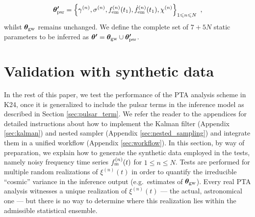\documentclass[fleqn,usenatbib,useAMS]{mnras}
\begin{document}
\begin{equation}
	\boldsymbol{\theta'}_{\rm psr} = \left \{ \gamma^{(n)},\sigma^{(n)}, f_{\rm em}^{(n)}(t_1),\dot{f}_{\rm em}^{(n)}(t_1),\chi^{(n)} \right\}_{1\leq n \leq N} \ ,  \label{eq:psrparamsnew}
\end{equation}
whilst $\boldsymbol{\theta}_{\rm gw}$  remains unchanged. We define the complete set of $7 +5N$ static parameters to be inferred as $\boldsymbol{\theta'} = \boldsymbol{\theta}_{\rm gw} \cup \boldsymbol{\theta'}_{\rm psr}$.  
%


\section{Validation with synthetic data}\label{sec:rep_example1}
In the rest of this paper, we test the performance of the PTA analysis scheme in K24, once it is generalized to include the pulsar terms in the inference model as described in Section \ref{sec:pulsar_term}. We refer the reader to the appendices for detailed instructions about how to implement the Kalman filter (Appendix \ref{sec:kalman}) and nested sampler (Appendix \ref{sec:nested_sampling}) and integrate them in a unified workflow (Appendix \ref{sec:workflow}). In this section, by way of preparation, we explain how to generate the synthetic data employed in the tests, namely noisy frequency time series $f_{\rm m}^{(n)}(t)$ for $1 \leq n \leq N$. Tests are performed for multiple random realizations of $\xi^{(n)}(t)$ in order to quantify the irreducible ``cosmic'' variance in the inference output (e.g.\ estimates of ${\boldsymbol{\theta}}_{\rm gw}$). Every real PTA analysis witnesses a unique realization of $\xi^{(n)}(t)$ --- the actual, astronomical one --- but there is no way to determine where this realization lies within the admissible statistical ensemble. \newline 
\end{document}
